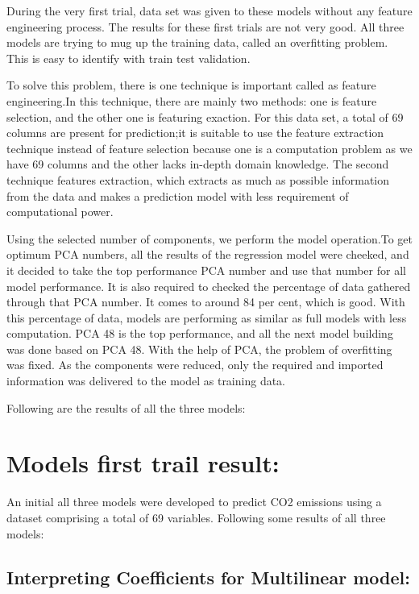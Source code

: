 \documentclass[12pt, a4paper,oneside]{book}
\numberwithin{equation}{section}
\begin{document}
During the very first trial, data set was given to these models without any feature engineering process. The results for these first trials are not very good. All three models are trying to mug up the training data, called an overfitting problem. This is easy to identify with train test validation. 

To solve this problem, there is one technique is important called as feature engineering.In this technique, there are mainly two methods: one is feature selection, and the other one is featuring exaction. For this data set, a total of 69 columns are present for prediction;it is suitable to use the feature extraction technique instead of feature selection because one is a computation problem as we have 69 columns and the other lacks in-depth domain knowledge. The second technique features extraction, which extracts as much as possible information from the data and makes a prediction model with less requirement of computational power.


Using the selected number of components, we perform the model operation.To get optimum PCA numbers, all the results of the regression model were cheeked, and it decided to take the top performance PCA number and use that number for all model performance. It is also required to checked the percentage of data gathered through that PCA number. It comes to around 84 per cent, which is good. With this percentage of data, models are  performing as similar as full models with less computation. PCA 48 is the top performance, and all the next model building was done based on PCA 48. With the help of PCA, the problem of overfitting was fixed. As the components were reduced, only the required and imported information was delivered to the model as training data.

Following are the results of all the three models:




\section{Models first trail result:}

An initial all three models were developed to predict CO2 emissions using a dataset comprising a total of 69 variables.
Following some results of all three models:

\subsection{Interpreting Coefficients for Multilinear model:}
\end{document}

